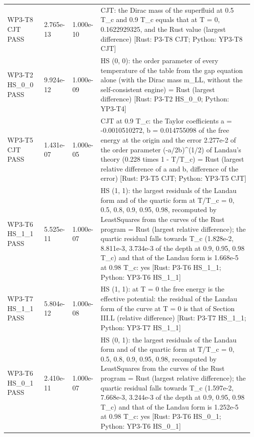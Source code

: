 \documentclass[aps,prd,onecolumn,superscriptaddress,nofootinbib,floatfix,longbibliography]{revtex4-2}
\begin{document}
\begin{longtable}{p{}p{}p{}p{}}
WP3-T8 CJT \newline PASS & 2.765e-13 & 1.000e-10 & CJT: the Dirac mass of the superfluid at 0.5 T\_c and 0.9 T\_c equals that at T = 0, 0.1622929325, and the Rust value (largest difference) [Rust: P3-T8 CJT; Python: YP3-T8 CJT] \\
WP3-T2 HS\_0\_0 \newline PASS & 9.924e-12 & 1.000e-09 & HS (0, 0): the order parameter of every temperature of the table from the gap equation alone (with the Dirac mass m\_LL, without the self-consistent engine) = Rust (largest difference) [Rust: P3-T2 HS\_0\_0; Python: YP3-T4] \\
WP3-T5 CJT \newline PASS & 1.431e-07 & 1.000e-05 & CJT at 0.9 T\_c: the Taylor coefficients a = -0.0010510272, b = 0.014755098 of the free energy at the origin and the error 2.277e-2 of the order parameter (-a/2b)\textasciicircum{}(1/2) of Landau's theory (0.228 times 1 - T/T\_c) = Rust (largest relative difference of a and b, difference of the error) [Rust: P3-T5 CJT; Python: YP3-T5 CJT] \\
WP3-T6 HS\_1\_1 \newline PASS & 5.525e-11 & 1.000e-07 & HS (1, 1): the largest residuals of the Landau form and of the quartic form at T/T\_c = 0, 0.5, 0.8, 0.9, 0.95, 0.98, recomputed by LeastSquares from the curves of the Rust program = Rust (largest relative difference); the quartic residual falls towards T\_c (1.828e-2, 8.811e-3, 3.734e-3 of the depth at 0.9, 0.95, 0.98 T\_c) and that of the Landau form is 1.668e-5 at 0.98 T\_c: yes [Rust: P3-T6 HS\_1\_1; Python: YP3-T6 HS\_1\_1] \\
WP3-T7 HS\_1\_1 \newline PASS & 5.804e-12 & 1.000e-08 & HS (1, 1): at T = 0 the free energy is the effective potential: the residual of the Landau form of the curve at T = 0 is that of Section III.L (relative difference) [Rust: P3-T7 HS\_1\_1; Python: YP3-T7 HS\_1\_1] \\
WP3-T6 HS\_0\_1 \newline PASS & 2.410e-11 & 1.000e-07 & HS (0, 1): the largest residuals of the Landau form and of the quartic form at T/T\_c = 0, 0.5, 0.8, 0.9, 0.95, 0.98, recomputed by LeastSquares from the curves of the Rust program = Rust (largest relative difference); the quartic residual falls towards T\_c (1.597e-2, 7.668e-3, 3.244e-3 of the depth at 0.9, 0.95, 0.98 T\_c) and that of the Landau form is 1.252e-5 at 0.98 T\_c: yes [Rust: P3-T6 HS\_0\_1; Python: YP3-T6 HS\_0\_1] \\

\end{longtable}
\end{document}
